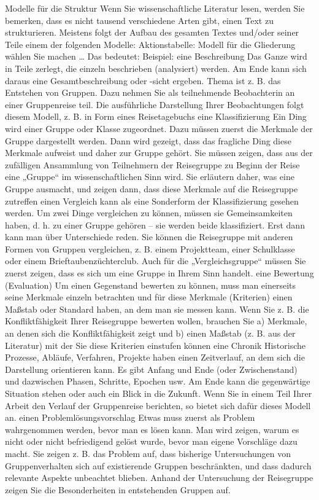 \documentclass[]{book}
\theoremstyle{definition}
\theoremstyle{definition}
\theoremstyle{definition}
\theoremstyle{remark}
\begin{document}
Modelle für die Struktur Wenn Sie wissenschaftliche Literatur lesen,
werden Sie bemerken, dass es nicht tausend verschiedene Arten gibt,
einen Text zu strukturieren. Meistens folgt der Aufbau des gesamten
Textes und/oder seiner Teile einem der folgenden Modelle:
Aktionstabelle: Modell für die Gliederung wählen Sie machen \ldots{} Das
bedeutet: Beispiel: eine Beschreibung Das Ganze wird in Teile zerlegt,
die einzeln beschrieben (analysiert) werden. Am Ende kann sich daraus
eine Gesamtbeschreibung oder -sicht ergeben. Thema ist z. B. das
Entstehen von Gruppen. Dazu nehmen Sie als teilnehmende Beobachterin an
einer Gruppenreise teil. Die ausführliche Darstellung Ihrer
Beobachtungen folgt diesem Modell, z. B. in Form eines Reisetagebuchs
eine Klassifizierung Ein Ding wird einer Gruppe oder Klasse zugeordnet.
Dazu müssen zuerst die Merkmale der Gruppe dargestellt werden. Dann wird
gezeigt, dass das fragliche Ding diese Merkmale aufweist und daher zur
Gruppe gehört. Sie müssen zeigen, dass aus der zufälligen Ansammlung von
Teilnehmern der Reisegruppe zu Beginn der Reise eine „Gruppe`` im
wissenschaftlichen Sinn wird. Sie erläutern daher, was eine Gruppe
ausmacht, und zeigen dann, dass diese Merkmale auf die Reisegruppe
zutreffen einen Vergleich kann als eine Sonderform der Klassifizierung
gesehen werden. Um zwei Dinge vergleichen zu können, müssen sie
Gemeinsamkeiten haben, d. h. zu einer Gruppe gehören -- sie werden beide
klassifiziert. Erst dann kann man über Unterschiede reden. Sie können
die Reisegruppe mit anderen Formen von Gruppen vergleichen, z. B. einem
Projektteam, einer Schulklasse oder einem Brieftaubenzüchterclub. Auch
für die „Vergleichsgruppe`` müssen Sie zuerst zeigen, dass es sich um
eine Gruppe in Ihrem Sinn handelt. eine Bewertung (Evaluation) Um einen
Gegenstand bewerten zu können, muss man einerseits seine Merkmale
einzeln betrachten und für diese Merkmale (Kriterien) einen Maßstab oder
Standard haben, an dem man sie messen kann. Wenn Sie z. B. die
Konfliktfähigkeit Ihrer Reisegruppe bewerten wollen, brauchen Sie a)
Merkmale, an denen sich die Konfliktfähigkeit zeigt und b) einen Maßstab
(z. B. aus der Literatur) mit der Sie diese Kriterien einstufen können
eine Chronik Historische Prozesse, Abläufe, Verfahren, Projekte haben
einen Zeitverlauf, an dem sich die Darstellung orientieren kann. Es gibt
Anfang und Ende (oder Zwischenstand) und dazwischen Phasen, Schritte,
Epochen usw. Am Ende kann die gegenwärtige Situation stehen oder auch
ein Blick in die Zukunft. Wenn Sie in einem Teil Ihrer Arbeit den
Verlauf der Gruppenreise berichten, so bietet sich dafür dieses Modell
an. einen Problemlösungsvorschlag Etwas muss zuerst als Problem
wahrgenommen werden, bevor man es lösen kann. Man wird zeigen, warum es
nicht oder nicht befriedigend gelöst wurde, bevor man eigene Vorschläge
dazu macht. Sie zeigen z. B. das Problem auf, dass bisherige
Untersuchungen von Gruppenverhalten sich auf existierende Gruppen
beschränkten, und dass dadurch relevante Aspekte unbeachtet blieben.
Anhand der Untersuchung der Reisegruppe zeigen Sie die Besonderheiten in
entstehenden Gruppen auf.
\end{document}
